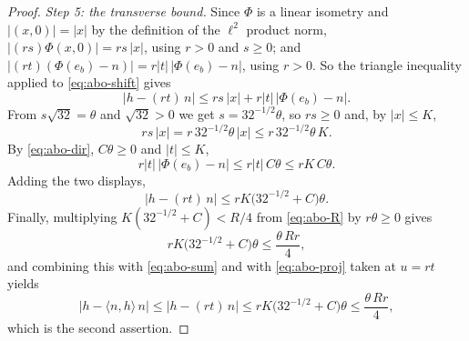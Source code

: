 \begin{proof}
\emph{Step 5: the transverse bound.}
Since $\Phi$ is a linear isometry and $|(x,0)|=|x|$ by the definition of the $\ell^2$
product norm, $\bigl|(rs)\Phi(x,0)\bigr|=rs\,|x|$, using $r>0$ and $s\ge0$; and
$\bigl|(rt)(\Phi(e_b)-n)\bigr|=r|t|\,\bigl|\Phi(e_b)-n\bigr|$, using $r>0$. So the
triangle inequality applied to \eqref{eq:abo-shift} gives
\[
  \bigl|h-(rt)\,n\bigr|\le rs\,|x|+r|t|\,\bigl|\Phi(e_b)-n\bigr| .
\]
From $s\sqrt{32}=\theta$ and $\sqrt{32}>0$ we get $s=32^{-1/2}\theta$, so
$rs\ge0$ and, by $|x|\le K$,
\[
  rs\,|x|=r\,32^{-1/2}\theta\,|x|\le r\,32^{-1/2}\theta\,K .
\]
By \eqref{eq:abo-dir}, $C\theta\ge0$ and $|t|\le K$,
\[
  r|t|\,\bigl|\Phi(e_b)-n\bigr|\le r|t|\,C\theta\le rK\,C\theta .
\]
Adding the two displays,
\begin{equation}\label{eq:abo-sum}
  \bigl|h-(rt)\,n\bigr|\le rK\bigl(32^{-1/2}+C\bigr)\theta .
\end{equation}
Finally, multiplying $K(32^{-1/2}+C)<R/4$ from \eqref{eq:abo-R} by $r\theta\ge0$ gives
\[
  rK\bigl(32^{-1/2}+C\bigr)\theta\le\frac{\theta\,Rr}4 ,
\]
and combining this with \eqref{eq:abo-sum} and with \eqref{eq:abo-proj} taken at
$u=rt$ yields
\[
  \bigl|h-\langle n,h\rangle\,n\bigr|\le\bigl|h-(rt)\,n\bigr|
    \le rK\bigl(32^{-1/2}+C\bigr)\theta\le\frac{\theta\,Rr}4 ,
\]
which is the second assertion.
\end{proof}
